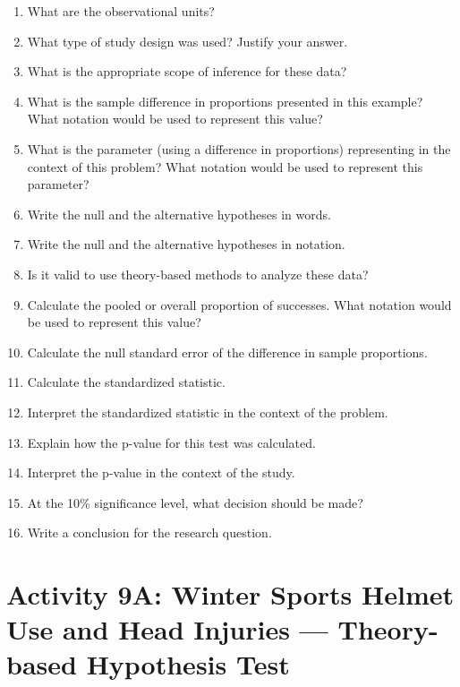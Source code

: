 \documentclass[
]{report}
\newcommand{\rgs}{\vspace{12pt}} %
\begin{document}
\begin{enumerate}
\def\labelenumi{\arabic{enumi}.}
\item
  What are the observational units?
  \rgs
\item
  What type of study design was used? Justify your answer.
  \rgs
\item
  What is the appropriate scope of inference for these data?
  \rgs
\item
  What is the sample difference in proportions presented in this example? What notation would be used to represent this value?
  \rgs
\item
  What is the parameter (using a difference in proportions) representing in the context of this problem? What notation would be used to represent this parameter?
  \rgs
\item
  Write the null and the alternative hypotheses in words.
  \rgs
  \rgs
\item
  Write the null and the alternative hypotheses in notation.
  \rgs
\item
  Is it valid to use theory-based methods to analyze these data?
  \rgs
  \rgs
\item
  Calculate the pooled or overall proportion of successes. What notation would be used to represent this value?
  \rgs
  \rgs
\item
  Calculate the null standard error of the difference in sample proportions.
  \rgs
  \rgs
\item
  Calculate the standardized statistic.
  \rgs
  \rgs
\item
  Interpret the standardized statistic in the context of the problem.
  \rgs
  \rgs
\item
  Explain how the p-value for this test was calculated.
  \rgs
\item
  Interpret the p-value in the context of the study.
  \rgs
  \rgs
\item
  At the 10\% significance level, what decision should be made?
  \rgs
\item
  Write a conclusion for the research question.
  \rgs
  \rgs
\end{enumerate}

\newpage

\hypertarget{activity-9a-winter-sports-helmet-use-and-head-injuries-theory-based-hypothesis-test}{%
\section{Activity 9A: Winter Sports Helmet Use and Head Injuries --- Theory-based Hypothesis Test}\label{activity-9a-winter-sports-helmet-use-and-head-injuries-theory-based-hypothesis-test}}
\end{document}
